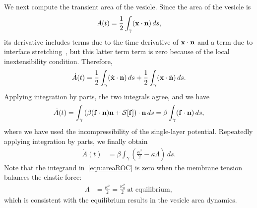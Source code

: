 \documentclass[9pt,twocolumn,twoside,lineno]{pnas-new}
\begin{document}
We next compute the transient area of the vesicle. Since the area of the
vesicle is
\begin{align}
  A(t) = \frac{1}{2}\int_{\gamma} (\mathbf{x} \cdot \mathbf{n})\, ds,
  \label{eqn:area}
\end{align}
its derivative includes terms due to the time derivative of $\mathbf{x} \cdot
\mathbf{n}$ and a term due to interface stretching~\cite{lai-tse-hua2008}, but
this latter term term is zero because of the local inextensibility
condition. Therefore,
\begin{align}
  \dot{A}(t) =
  \frac{1}{2} \int_{\gamma} (\dot{\mathbf{x}} \cdot \mathbf{n})\, ds  + 
  \frac{1}{2} \int_{\gamma} (\mathbf{x} \cdot \dot{\mathbf{n}})\, ds.
\end{align}
Applying integration by parts, the two integrals agree, and we have
\begin{align}
  \dot{A}(t) = \int_\gamma \left(\beta (\mathbf{f} \cdot \mathbf{n})\mathbf{n} 
    + \mathcal{S}[\mathbf{f}]\right) \cdot \mathbf{n}\, ds 
  = \beta \int_\gamma (\mathbf{f} \cdot \mathbf{n})\, ds,
\end{align}
where we have used the incompressibility of the single-layer potential.
Repeatedly applying integration by parts, we finally obtain
\begin{align}
  \dot{A}(t) & = \beta \int_\gamma \left(
    \frac{\kappa^3}{2} - \kappa \Lambda \right) \, ds.
  \label{eqn:areaROC}
\end{align}
Note that the integrand in~\eqref{eqn:areaROC} is zero when the membrane tension balances the elastic force:
\begin{align}
\Lambda &= \frac{\kappa^2}{2}=\frac{\kappa_0^2}{2} \;\mathrm{ at }\; \mathrm{equilibrium},
\end{align}
which is consistent with the equilibrium results in the vesicle area dynamics.
\end{document}
